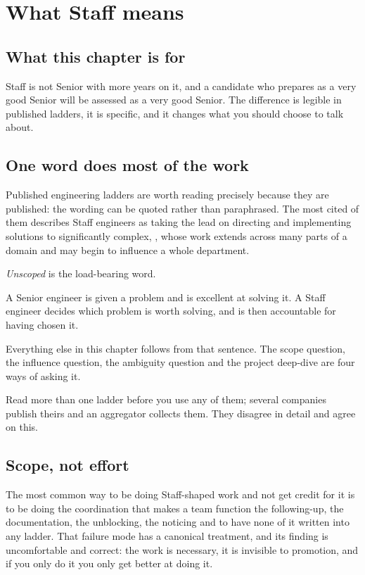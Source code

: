 \chapter{What Staff means}
\label{ch:staff}

\section*{What this chapter is for}

Staff is not Senior with more years on it, and a candidate who prepares as a
very good Senior will be assessed as a very good Senior. The difference is
legible in published ladders, it is specific, and it changes what you should
choose to talk about.

\section{One word does most of the work}

Published engineering ladders are worth reading precisely because they are
published: the wording can be quoted rather than paraphrased. The most cited of
them describes Staff engineers as taking the lead on directing and implementing
solutions to significantly complex, , whose work extends across many parts of a domain and
may begin to influence a whole department.

\emph{Unscoped} is the load-bearing word.

\begin{kitnote}
A Senior engineer is given a problem and is excellent at solving it. A Staff
engineer decides which problem is worth solving, and is then accountable for
having chosen it.

Everything else in this chapter follows from that sentence. The scope question,
the influence question, the ambiguity question and the project deep-dive are
four ways of asking it.
\end{kitnote}

Read more than one ladder before you use any of them; several companies publish
theirs and an aggregator collects them. They disagree in
detail and agree on this.

\section{Scope, not effort}

The most common way to be doing Staff-shaped work and not get credit for it is
to be doing the coordination that makes a team function \dash{} the following-up,
the documentation, the unblocking, the noticing \dash{} and to have none of it
written into any ladder. That failure mode has a canonical
treatment, and its finding is uncomfortable and correct: the
work is necessary, it is invisible to promotion, and if you only do it you only
get better at doing it.

